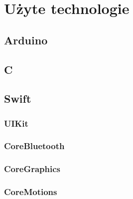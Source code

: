 \chapter{Użyte technologie}
\section{Arduino}
\section{C}
\section{Swift}
\subsection{UIKit}
\subsection{CoreBluetooth}
\subsection{CoreGraphics}
\subsection{CoreMotions}
